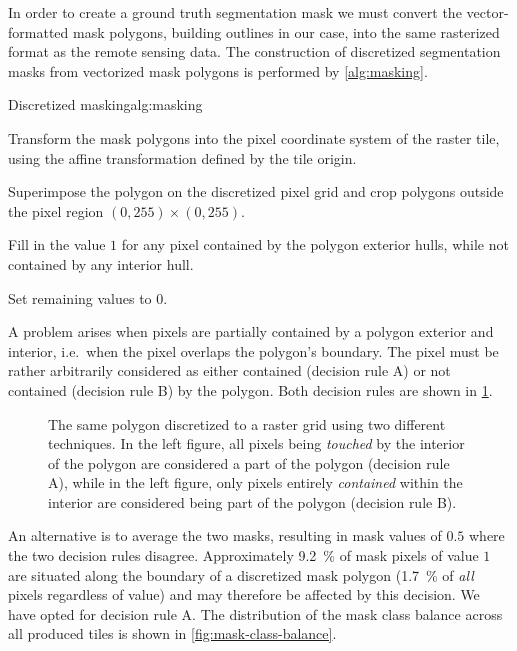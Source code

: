 In order to create a ground truth segmentation mask we must convert the vector-formatted mask polygons, building outlines in our case, into the same rasterized format as the remote sensing data.
The construction of discretized segmentation masks from vectorized mask polygons is performed by \cref{alg:masking}.

\begin{algorithm}{Discretized masking}{alg:masking}
  \item Transform the mask polygons into the pixel coordinate system of the raster tile, using the affine transformation defined by the tile origin.
  \item Superimpose the polygon on the discretized pixel grid and crop polygons outside the pixel region $(0, 255) \times (0, 255)$.
  \item Fill in the value $1$ for any pixel contained by the polygon exterior hulls, while not contained by any interior hull.
  \item Set remaining values to $0$.
\end{algorithm}

A problem arises when pixels are partially contained by a polygon exterior and interior, i.e.\ when the pixel overlaps the polygon's boundary.
The pixel must be rather arbitrarily considered as either contained (decision rule A) or not contained (decision rule B) by the polygon.
Both decision rules are shown in \cref{fig:pixel-containment}.

\begin{figure}[H]
  \centering
  
  \hspace{2em}
  
  \caption{%
    The same polygon discretized to a raster grid using two different techniques.
    In the left figure, all pixels being \textit{touched} by the interior of the polygon
    are considered a part of the polygon (decision rule A), while in the left figure, only pixels
    entirely \textit{contained} within the interior are considered being part
    of the polygon (decision rule B).
  }%
  \label{fig:pixel-containment}
\end{figure}

An alternative is to average the two masks, resulting in mask values of $0.5$ where the two decision rules disagree.
Approximately \SI{9.2}{\percent} of mask pixels of value $1$ are situated along the boundary of a discretized mask polygon (\SI{1.7}{\percent} of \textit{all} pixels regardless of value) and may therefore be affected by this decision.
We have opted for decision rule A.
The distribution of the mask class balance across all produced tiles is shown in \cref{fig:mask-class-balance}.

